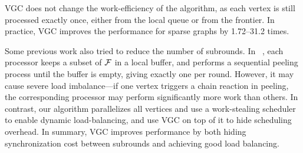VGC does not change the work-efficiency of the algorithm, as each vertex is still processed exactly once, 
either from the local queue or from the frontier. 
In practice, VGC improves the performance for sparse graphs by 1.72--31.2 times. 

Some previous work also tried to reduce the number of subrounds. 
In \PKC{}~\cite{kabir2017parallel}, each processor keeps a subset of ${\mathcal{F}}$ in a local buffer, and performs a sequential peeling process until the buffer is empty, giving exactly one \subround per round. 
However, it may cause severe load imbalance---if one vertex triggers a chain reaction in peeling, 
the corresponding processor may perform significantly more work than others. 
In contrast, our algorithm parallelizes all vertices and use a work-stealing scheduler to enable dynamic load-balancing, 
and use VGC on top of it to hide scheduling overhead. 
In summary, VGC improves performance by both hiding synchronization cost between subrounds and achieving good load balancing. 








